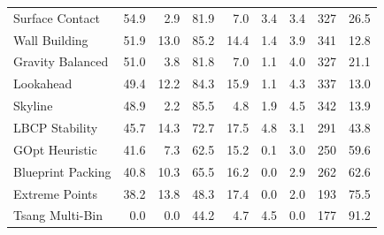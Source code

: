 \begin{table}[htbp]
\begin{tabular}{lrrrrrrrr}
\rowcolor{rowalt} Surface Contact & 54.9 & 2.9 & 81.9 & 7.0 & 3.4 & 3.4 & 327 & 26.5 \\
Wall Building & 51.9 & 13.0 & 85.2 & 14.4 & 1.4 & 3.9 & 341 & 12.8 \\
\rowcolor{rowalt} Gravity Balanced & 51.0 & 3.8 & 81.8 & 7.0 & 1.1 & 4.0 & 327 & 21.1 \\
Lookahead & 49.4 & 12.2 & 84.3 & 15.9 & 1.1 & 4.3 & 337 & 13.0 \\
\rowcolor{rowalt} Skyline & 48.9 & 2.2 & 85.5 & 4.8 & 1.9 & 4.5 & 342 & 13.9 \\
LBCP Stability & 45.7 & 14.3 & 72.7 & 17.5 & 4.8 & 3.1 & 291 & 43.8 \\
\rowcolor{rowalt} GOpt Heuristic & 41.6 & 7.3 & 62.5 & 15.2 & 0.1 & 3.0 & 250 & 59.6 \\
Blueprint Packing & 40.8 & 10.3 & 65.5 & 16.2 & 0.0 & 2.9 & 262 & 62.6 \\
\rowcolor{rowalt} Extreme Points & 38.2 & 13.8 & 48.3 & 17.4 & 0.0 & 2.0 & 193 & 75.5 \\
Tsang Multi-Bin & 0.0 & 0.0 & 44.2 & 4.7 & 4.5 & 0.0 & 177 & 91.2 \\
\bottomrule
\end{tabular}
\end{table}